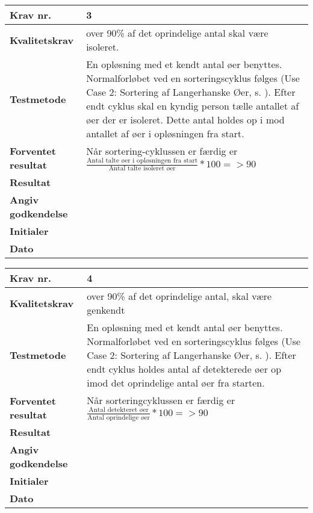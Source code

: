\newpage
			
	\begin{center}
		\begin{longtable}{ | m{4cm}| m{8.5cm}|} 
			\hline
			\textbf{Krav nr.} & 3 \\ 
			\hline
			\textbf{Kvalitetskrav} & over 90\% af det oprindelige antal skal være isoleret. \\
			\hline
			\textbf{Testmetode} &  En opløsning med et kendt antal øer benyttes. Normalforløbet ved en sorteringscyklus følges (Use Case 2: Sortering af Langerhanske Øer, s. \pageref{uc:2}). Efter endt cyklus skal en kyndig person tælle antallet af øer der er isoleret. Dette antal holdes op i mod antallet af øer i opløsningen fra start.  \\
			\hline
			\textbf{Forventet resultat}  & Når sortering-cyklussen er færdig er
 $\frac{\text{Antal talte øer i opløsningen fra start}}{\text{Antal talte isoleret øer}}*100= >90$
 \\
			\hline
			\textbf{Resultat}  &    \\
			\hline
			\textbf{Angiv godkendelse} &     \\
			\hline
			\textbf{Initialer} &     \\
			\hline
			\textbf{Dato} &    \\
			\hline
		\end{longtable}
	\end{center}		
			
	\begin{center}
		\begin{longtable}{ | m{4cm}| m{8.5cm}|} 
			\hline
			\textbf{Krav nr.} & 4 \\ 
			\hline
			\textbf{Kvalitetskrav} & over 90\% af det oprindelige antal, skal være genkendt \\
			\hline
			\textbf{Testmetode} &  En opløsning med et kendt antal øer benyttes. Normalforløbet ved en sorteringscyklus følges (Use Case 2: Sortering af Langerhanske Øer, s. \pageref{uc:2}). Efter endt cyklus holdes antal af detekterede øer op imod det oprindelige antal øer fra starten.  \\
			\hline
			\textbf{Forventet resultat}  & Når sorteringcyklussen er færdig er
 $\frac{\text{Antal detekteret øer}}{\text{Antal oprindelige øer}} * 100 = >90$ \\
			\hline
			\textbf{Resultat}  &    \\
			\hline
			\textbf{Angiv godkendelse} &     \\
			\hline
			\textbf{Initialer} &     \\
			\hline
			\textbf{Dato} &    \\
			\hline
		\end{longtable}
	\end{center}				
\newpage	
			
